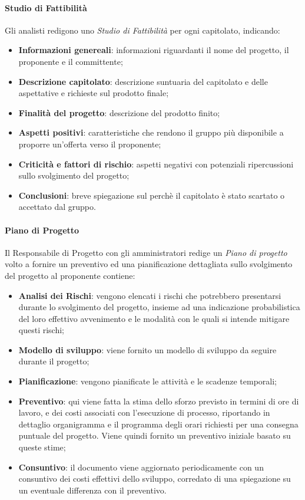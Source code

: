 		    \paragraph{Studio di Fattibilità}
		    Gli analisti redigono uno \textit{Studio di Fattibilità} per ogni capitolato, indicando:
		    \begin{itemize}
		        \item \textbf{Informazioni genereali}: informazioni riguardanti il nome del progetto, il proponente e il committente;
		        \item \textbf{Descrizione capitolato}: descrizione suntuaria del capitolato e delle aspettative e richieste sul prodotto finale;
		        \item \textbf{Finalità del progetto}: descrizione del prodotto finito;
		        \item \textbf{Aspetti positivi}: caratteristiche che rendono il gruppo più disponibile a proporre un'offerta verso il proponente;
		        \item \textbf{Criticità e fattori di rischio}: aspetti negativi con potenziali ripercussioni sullo svolgimento del progetto;
		        \item \textbf{Conclusioni}: breve spiegazione sul perchè il capitolato è stato scartato o accettato dal gruppo.
		    \end{itemize}
			\paragraph{Piano di Progetto}
			Il Responsabile di Progetto con gli amministratori redige un \textit{Piano di progetto} volto a fornire un preventivo ed una pianificazione dettagliata sullo svolgimento del progetto al proponente contiene:
			\begin{itemize}
			    \item \textbf{Analisi dei Rischi}: vengono elencati i rischi che potrebbero presentarsi durante lo svolgimento del progetto, insieme ad una indicazione probabilistica del loro effettivo avvenimento e le modalità con le quali si intende mitigare questi rischi;
			    \item \textbf{Modello di sviluppo}: viene fornito un modello di sviluppo da seguire durante il progetto;
			    \item \textbf{Pianificazione}: vengono pianificate le attività e le scadenze temporali;
			    \item \textbf{Preventivo}: qui viene fatta la stima dello sforzo previsto in termini di ore di lavoro, e dei costi associati con l'esecuzione di processo, riportando in dettaglio organigramma e il programma degli orari richiesti per una consegna puntuale del progetto. Viene quindi fornito un preventivo iniziale basato su queste stime;
			    \item \textbf{Consuntivo}: il documento viene aggiornato periodicamente con un consuntivo dei costi effettivi dello sviluppo, corredato di una spiegazione su un eventuale differenza con il preventivo.
			\end{itemize}
